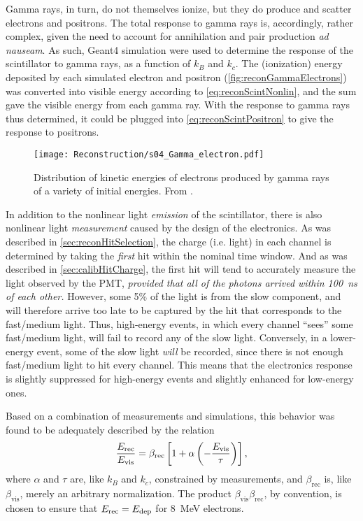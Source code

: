 \documentclass[../thesis.tex]{subfiles}
\begin{document}
Gamma rays, in turn, do not themselves ionize, but they do produce and scatter electrons and positrons. The total response to gamma rays is, accordingly, rather complex, given the need to account for annihilation and pair production \emph{ad nauseam}. As such, Geant4 simulation were used to determine the response of the scintillator to gamma rays, as a function of $k_B$ and $k_c$. The (ionization) energy deposited by each simulated electron and positron (\autoref{fig:reconGammaElectrons}) was converted into visible energy according to \eqref{eq:reconScintNonlin}, and the sum gave the visible energy from each gamma ray. With the response to gamma rays thus determined, it could be plugged into \eqref{eq:reconScintPositron} to give the response to positrons.

\begin{figure}[h]
  \texttt{[image: Reconstruction/s04\_Gamma\_electron.pdf]}
  \caption{Distribution of kinetic energies of electrons produced by gamma rays of a variety of initial energies. From \cite{NonlinearityPaper}.}
  \label{fig:reconGammaElectrons}
\end{figure}

In addition to the nonlinear light \emph{emission} of the scintillator, there is also nonlinear light \emph{measurement} caused by the design of the electronics. As was described in \autoref{sec:reconHitSelection}, the charge (i.e. light) in each channel is determined by taking the \emph{first} hit within the nominal time window. And as was described in \autoref{sec:calibHitCharge}, the first hit will tend to accurately measure the light observed by the PMT, \emph{provided that all of the photons arrived within 100~ns of each other.} However, some 5\% of the light is from the slow component, and will therefore arrive too late to be captured by the hit that corresponds to the fast/medium light. Thus, high-energy events, in which every channel ``sees'' some fast/medium light, will fail to record any of the slow light. Conversely, in a lower-energy event, some of the slow light \emph{will} be recorded, since there is not enough fast/medium light to hit every channel. This means that the electronics response is slightly suppressed for high-energy events and slightly enhanced for low-energy ones.

Based on a combination of measurements and simulations, this behavior was found to be adequately described by the relation
\begin{equation}
  \frac{E_\mathrm{rec}}{E_\mathrm{vis}} = \beta_{\mathrm{rec}}\left[ 1 + \alpha \left( - \frac{E_\mathrm{vis}}{\tau} \right) \right],
  \label{eq:reconScintElec}
\end{equation}
where $\alpha$ and $\tau$ are, like $k_B$ and $k_c$, constrained by measurements, and $\beta_{\mathrm{rec}}$ is, like $\beta_{\mathrm{vis}}$, merely an arbitrary normalization. The product $\beta_{\mathrm{vis}}\beta_{\mathrm{rec}}$, by convention, is chosen to ensure that $E_\mathrm{rec} = E_\mathrm{dep}$ for 8~MeV electrons.
\end{document}
